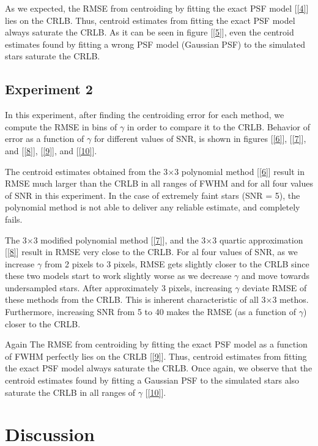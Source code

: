 \documentclass[12pt, preprint]{aastex}
\begin{document}
As we expected, the RMSE from centroiding by fitting the exact PSF model [\ref{4}] lies on the CRLB. Thus, centroid estimates from fitting the exact PSF model always saturate the CRLB. As it can be seen in figure [\ref{5}], even the centroid estimates found by fitting a wrong PSF model (Gaussian PSF) to the simulated stars saturate the CRLB.

\subsection{Experiment 2}
In this experiment, after finding the centroiding error for each method, we compute the RMSE in bins of $\gamma$ in order to compare it to the CRLB. 
Behavior of error as a function of $\gamma$ for different values of SNR, is shown in figures [\ref{6}], [\ref{7}], and [\ref{8}], [\ref{9}], and [\ref{10}]. 
 
The centroid estimates obtained from the 3$\times$3 polynomial method [\ref{6}] result in RMSE much larger than the CRLB in all ranges of FWHM and for all four values of SNR in this experiment. In the case of extremely faint stars (SNR = 5), the polynomial method is not able to deliver any reliable estimate, and completely fails.

The 3$\times$3 modified polynomial method [\ref{7}], and the 3$\times$3 quartic approximation [\ref{8}] result in RMSE very close to the CRLB. For al four values of SNR, as we increase $\gamma$ from 2 pixels to 3 pixels, RMSE gets slightly closer to the CRLB since these two models start to work slightly worse as we decrease $\gamma$ and move towards undersampled stars. After approximately 3 pixels, increasing $\gamma$ deviate RMSE of these methods from the CRLB. This is inherent characteristic of all 
3$\times$3 methos. Furthermore, increasing SNR from 5 to 40 makes the RMSE (as a function of $\gamma$) closer to the CRLB.

Again The RMSE from centroiding by fitting the exact PSF model as a function of FWHM perfectly lies on the CRLB [\ref{9}]. Thus, centroid estimates from fitting the exact PSF model always saturate the CRLB. Once again, we observe that the centroid estimates found by fitting a Gaussian PSF to the simulated stars also saturate the CRLB in all ranges of $\gamma$ [\ref{10}].


\section{Discussion}\label{sec:discussion}
\end{document}
